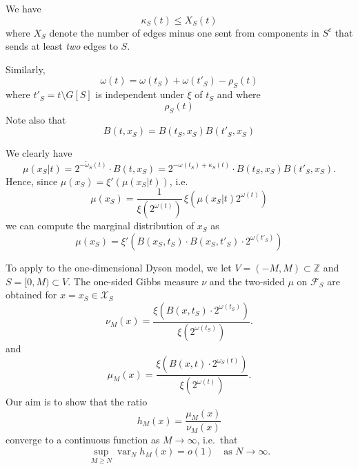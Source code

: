 \documentclass[11pt, a4paper, oneside]{article}
\theoremstyle{definition}
\theoremstyle{remark}
\providecommand{\ZZ}{\mathbb{Z}}
\providecommand{\mscr}{\mathscr}
\providecommand{\opn}{\operatorname}
\providecommand{\var}{\opn{var}}
\providecommand{\ordo}[1]{{o(#1)}}
\providecommand{\tl}{\tilde}
\def\X{\mscr X}
\begin{document}
We have
\[
  \kappa_S(t) \le X_S(t)
\]
where $X_S$ denote the number of edges minus one sent from components in $S^c$
that sends at least \emph{two} edges to $S$.

Similarly,
\[
  \omega(t) = \omega(t_S)+\omega(t'_S) - \rho_S(t)
\]
where $t'_S = t\setminus G[S]$ is independent under $\xi$ of $t_S$ and where
\[
  \rho_S(t)
\]
Note also that
\[
  B(t,x_S) = B(t_S,x_S) B(t'_S,x_S)
\]
 

We clearly have
\[
  \mu(x_S|t) = 2^{-\tl\omega_S(t)} \cdot B(t,x_S) = 2^{-\omega(t_S) +
    \kappa_S(t)} \cdot B(t_S,x_S) B(t'_S,x_S).
\]
Hence, since $\mu(x_S)=\xi'(\mu(x_S|t))$, i.e.\
\[
  \mu(x_S) = \frac1{\xi(2^{\omega(t)})} \, \xi\left(\mu(x_S|t)
    2^{\omega(t)}\right)
\]
we can compute the marginal distribution of $x_S$ as
\begin{equation}
  \mu(x_S) = 
  \xi'\left(B(x_S,t_S)\cdot B(x_S,t'_S)\cdot 2^{\omega(t'_S)}\right)
\end{equation}

To apply to the one-dimensional Dyson model, we let $V=(-M,M)\subset\ZZ$ and
$S=[0,M)\subset V$. The one-sided Gibbs measure $\nu$ and the two-sided $\mu$ on
$\mscr F_S$ are obtained for $x=x_S\in \X_S$
\[
  \nu_M(x) = \frac {\xi\left(B(x,t_S)\cdot 2^{\omega(t_S)}\right)}
  {\xi(2^{\omega(t_S)})}.
\]
and
\[
  \mu_M(x) = \frac {\xi\left(B(x,t)\cdot 2^{\omega_S(t)}\right)}
  {\xi(2^{\omega(t)})}.
\]
Our aim is to show that the ratio
\[
  h_M(x) = \frac{\mu_M(x)}{\nu_M(x)}
\]
converge to a continuous function as $M\to\infty$, i.e.\ that
\[
  \sup_{M\ge N} \var_N h_M(x) = \ordo1 \quad\text{as $N\to\infty$}.
\]
\end{document}
